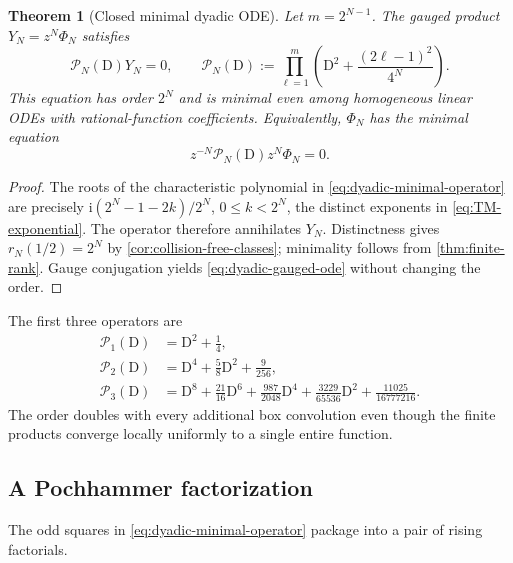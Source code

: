 \documentclass[11pt]{article}
\numberwithin{equation}{section}
\newtheorem{theorem}{Theorem}[section]
\theoremstyle{definition}
\theoremstyle{remark}
\newcommand{\ii}{\mathrm i}
\newcommand{\D}{\mathrm D}
\begin{document}
\begin{theorem}[Closed minimal dyadic ODE]
\label{thm:dyadic-minimal-ode}
Let $m=2^{N-1}$.  The gauged product $Y_N=z^N\Phi_N$ satisfies
\begin{equation}
 \boxed{
 \mathcal P_N(\D)Y_N=0,
 \qquad
 \mathcal P_N(\D):=
 \prod_{\ell=1}^{m}
 \left(\D^2+\frac{(2\ell-1)^2}{4^N}\right).}
 \label{eq:dyadic-minimal-operator}
\end{equation}
This equation has order $2^N$ and is minimal even among homogeneous linear
ODEs with rational-function coefficients.  Equivalently, $\Phi_N$ has the
minimal equation
\begin{equation}
 z^{-N}\mathcal P_N(\D)z^N\Phi_N=0.
 \label{eq:dyadic-gauged-ode}
\end{equation}
\end{theorem}
\begin{proof}
The roots of the characteristic polynomial in
\eqref{eq:dyadic-minimal-operator} are precisely
\(\ii(2^N-1-2k)/2^N\), $0\le k<2^N$, the distinct exponents in
\eqref{eq:TM-exponential}.  The operator therefore annihilates $Y_N$.
Distinctness gives $r_N(1/2)=2^N$ by
\cref{cor:collision-free-classes}; minimality follows from
\cref{thm:finite-rank}.  Gauge conjugation yields
\eqref{eq:dyadic-gauged-ode} without changing the order.
\end{proof}

The first three operators are
\begin{align}
 \mathcal P_1(\D)
 &=\D^2+\frac14,\label{eq:P1}\\
 \mathcal P_2(\D)
 &=\D^4+\frac58\D^2+\frac{9}{256},\label{eq:P2}\\
 \mathcal P_3(\D)
 &=\D^8+\frac{21}{16}\D^6+\frac{987}{2048}\D^4
   +\frac{3229}{65536}\D^2+\frac{11025}{16777216}.
 \label{eq:P3}
\end{align}
The order doubles with every additional box convolution even though the finite
products converge locally uniformly to a single entire function.

\subsection{A Pochhammer factorization}

The odd squares in \eqref{eq:dyadic-minimal-operator} package into a pair of
rising factorials.
\end{document}
